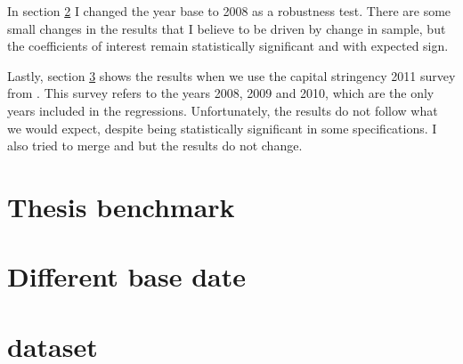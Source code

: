 \documentclass[12pt]{article}
\begin{document}
	 In section \ref{sec:base_year} I changed the year base to 2008 as a robustness test. There are some small changes in the results that I believe to be driven by change in sample, but the coefficients of interest remain statistically significant and with expected sign.
	 
	 Lastly, section \ref{sec:barth} shows the results when we use the capital stringency 2011 survey from \cite*{barth2013bank}. This survey refers to the years 2008, 2009 and 2010, which are the only years included in the regressions. Unfortunately, the results do not follow what we would expect, despite being statistically significant in some specifications. I also tried to merge \cite{barth2013bank} and \cite{cerutti2017changes} but the results do not change.   	      
 		
 		\section{Thesis benchmark} \label{sec:benchmark}
 		
 	\begin{small}
 	{
 		
 	}
 \end{small}
 
 	\begin{small}
 	{
 		
 	}
 \end{small}
 
	\section{Different base date} \label{sec:base_year}
	
		\begin{small}
		{
			
		}
	\end{small}

	 	\begin{small}
	 	{\setstretch{1.0}
	 		
	 	}
	 \end{small}
 
		\section{\cite{barth2013bank} dataset} \label{sec:barth}
	 
\end{document}
